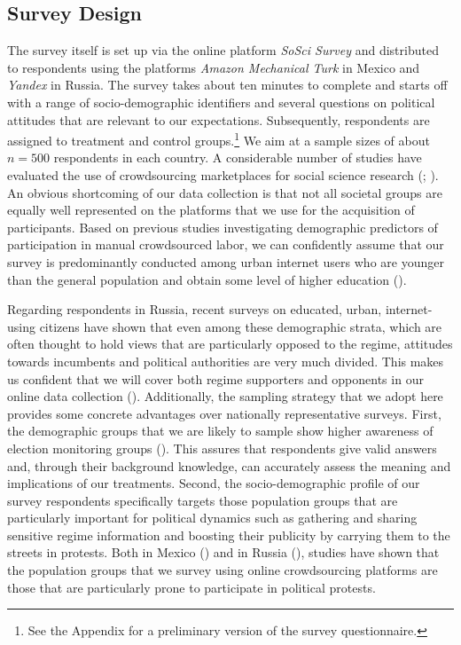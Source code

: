 \documentclass[11pt, ngerman,english,a4]{article}
\begin{document}
\subsection*{Survey Design}
The survey itself is set up via the online platform \textit{SoSci Survey} and distributed to respondents using the platforms \textit{Amazon Mechanical Turk} in Mexico and \textit{Yandex} in Russia. The survey takes about ten minutes to complete and starts off with a range of socio-demographic identifiers and several questions on political attitudes that are relevant to our expectations. Subsequently, respondents are assigned to treatment and control groups.\footnote{See the Appendix for a preliminary version of the survey questionnaire.} We aim at a sample sizes of about $n=500$ respondents in each country. A considerable number of studies have evaluated the use of crowdsourcing marketplaces for social science research (\citealt{Bartneck2015}; \citealt{Berinsky2012}). An obvious shortcoming of our data collection is that not all societal groups are equally well represented on the platforms that we use for the acquisition of participants. Based on previous studies investigating demographic predictors of participation in manual crowdsourced labor, we can confidently assume that our survey is predominantly conducted among urban internet users who are younger than the general population and obtain some level of higher education (\citealt{Berinsky2012}). 

Regarding respondents in Russia, recent surveys on educated, urban, internet-using citizens have shown that even among these demographic strata, which are often thought to hold views that are particularly opposed to the regime, attitudes towards incumbents and political authorities are very much divided. This makes us confident that we will cover both regime supporters and opponents in our online data collection (\citealt{Robertson2017}). Additionally, the sampling strategy that we adopt here provides some concrete advantages over nationally representative surveys. First, the demographic groups that we are likely to sample show higher awareness of election monitoring groups (\citealt{Robertson2017}). This assures that respondents give valid answers and, through their background knowledge, can accurately assess the meaning and implications of our treatments. Second, the socio-demographic profile of our survey respondents specifically targets those population groups that are particularly important for political dynamics such as gathering and sharing sensitive regime information and boosting their publicity by carrying them to the streets in protests. Both in Mexico (\citealt{Inclan2017}) and in Russia (\citealt{Rosenfeld2017}), studies have shown that the population groups that we survey using online crowdsourcing platforms are those that are particularly prone to participate in political protests.  
\end{document}
